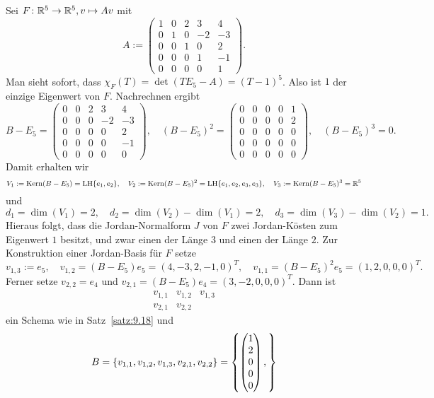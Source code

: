 \begin{beispiel}
	\label{bsp:9.20}
	Sei $F\colon \mathbb{R}^5 \rightarrow \mathbb{R}^5, v \mapsto Av$ mit
	\[
		A := \begin{pmatrix}
			1 & 0 & 2 & 3 & 4 \\
			0 & 1 & 0 & -2 & -3 \\
			0 & 0 & 1 & 0 & 2 \\
			0 & 0 & 0 & 1 & -1 \\
			0 & 0 & 0 & 0 & 1
		\end{pmatrix}.
	\]
	Man sieht sofort, dass $\chi_F(T) = \det(TE_5-A) = (T-1)^5$.
	Also ist $1$ der einzige Eigenwert von $F$.
	Nachrechnen ergibt
	\[
		B - E_5 = \begin{pmatrix}
		0 & 0 & 2 & 3 & 4 \\
		0 & 0 & 0 & -2 & -3 \\
		0 & 0 & 0 & 0 & 2 \\
		0 & 0 & 0 & 0 & -1 \\
		0 & 0 & 0 & 0 & 0
		\end{pmatrix}, \quad (B-E_5)^2 = \begin{pmatrix}
		0 & 0 & 0 & 0 & 1 \\
		0 & 0 & 0 & 0 & 2 \\
		0 & 0 & 0 & 0 & 0 \\
		0 & 0 & 0 & 0 & 0 \\
		0 & 0 & 0 & 0 & 0
		\end{pmatrix}, \quad (B-E_5)^3 = 0.
	\]
	Damit erhalten wir
	\[
		V_1 := \operatorname{Kern}(B-E_5) = \operatorname{LH}\{e_1,e_2\}, \quad V_2 := \operatorname{Kern}(B-E_5)^2 = \operatorname{LH}\{e_1,e_2,e_3,e_3\}, \quad V_3 := \operatorname{Kern}(B-E_5)^3 = \mathbb{R}^5
	\]
	und
	\[
		d_1 = \dim(V_1) = 2,  \quad d_2 = \dim(V_2) - \dim(V_1) = 2, \quad d_3 = \dim(V_3) - \dim(V_2) = 1.
	\]
	Hieraus folgt, dass die Jordan-Normalform $J$ von $F$ zwei Jordan-Kösten zum Eigenwert $1$ besitzt, und zwar einen der Länge $3$ und einen der Länge $2$.
	Zur Konstruktion einer Jordan-Basis für $F$ setze
	\[
		v_{1,3} := e_5, \quad v_{1,2} = (B-E_5)e_5 = (4,-3,2,-1,0)^T, \quad v_{1,1} = (B-E_5)^2 e_5 = (1,2,0,0,0)^T.
	\]
	Ferner setze $v_{2,2} = e_4$ und $v_{2,1} = (B-E_5)e_4 = (3,-2,0,0,0)^T$.
	Dann ist
	\[
		\begin{array}{ccc}
			v_{1,1} & v_{1,2} & v_{1,3} \\
			v_{2,1} & v_{2,2}
		\end{array}
	\]
	ein Schema wie in Satz~\ref{satz:9.18} und
	\[
		B = \{v_{1,1},v_{1,2},v_{1,3},v_{2,1},v_{2,2}\} = \left\{
			\begin{pmatrix} 1 \\ 2 \\ 0 \\ 0 \\ 0 \end{pmatrix},
\right\}\]
\end{beispiel}
